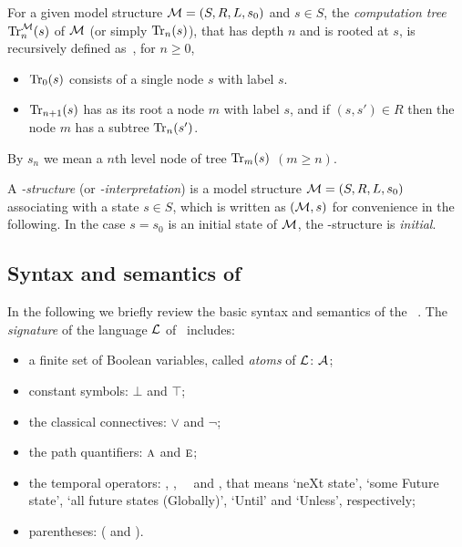 \documentclass{article}
\begin{document}
For a given model structure ${\cal M}=(S,R,L,s_0)$ and $s\in S$,
the {\em computation tree}
$\textrm{Tr}_n^{\cal M}(s)$ of $\cal M$ (or simply $\textrm{Tr}_n(s)$), that has depth $n$ and is rooted at $s$, is recursively defined as~\cite{DBLP:journals/tcs/BrowneCG88}, for $n\ge 0$,
\begin{itemize}
  \item $\textrm{Tr}_0(s)$ consists of a single node $s$ with label $s$.
  \item $\textrm{Tr}_{n+1}(s)$ has as its root a node $m$ with label  $s$, and
  if $(s,s')\in R$ then the node $m$ has a subtree $\textrm{Tr}_n(s')$.
\end{itemize}
By $s_n$ we mean a $n$th level node of tree $\textrm{Tr}_m(s)$ $(m \geq n)$.

A {\em \MPK-structure} (or {\em \MPK-interpretation}) is a model structure
${\cal M}=(S, R, L, s_0)$ associating
with a state $s\in S$, which is written as $({\cal M},s)$ for convenience in the following.
In the case $s=s_0$ is an initial state of $\cal M$, the \MPK-structure is {\em initial}.



\subsection{Syntax and semantics of \CTL}
In the following we briefly review the basic syntax and semantics
of the \CTL~\cite{DBLP:journals/toplas/ClarkeES86}.
The {\em signature} of the language $\cal L$ of \CTL\ includes:
\begin{itemize}
  \item a finite set of Boolean variables, called {\em atoms} of $\cal L$: $\cal A$;
  \item constant symbols: $\bot$ and $\top$;
  \item the classical connectives: $\lor$ and $\neg$;
  \item the path quantifiers: $\textsc{a}$ and $\textsc{e}$;
  \item the temporal operators: \NEXT, \FUTURE, \GLOBAL\, \UNTIL\ and \UNLESS, that
  means `neXt state', `some Future state', `all future states (Globally)', `Until' and `Unless', respectively;
  \item parentheses: ( and ).
\end{itemize}
\end{document}
